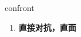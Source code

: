 
\begin{frame}
{\huge confront}
\begin{center}
\begin{enumerate}\Large
  \item \textbf{直接对抗，直面}
\end{enumerate}
\end{center}
\end{frame}
